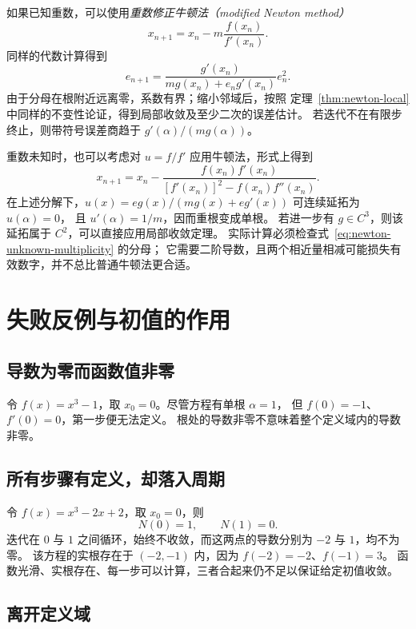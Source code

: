 \documentclass[UTF8,12pt,a4paper,fontset=fandol]{ctexart}
\begin{document}
如果已知重数，可以使用\emph{重数修正牛顿法（modified Newton method）}
\begin{equation}\label{eq:newton-modified}
  x_{n+1}=x_n-m\frac{f(x_n)}{f'(x_n)}.
\end{equation}
同样的代数计算得到
\[
  e_{n+1}=\frac{g'(x_n)}{mg(x_n)+e_ng'(x_n)}e_n^2.
\]
由于分母在根附近远离零，系数有界；缩小邻域后，按照
定理~\ref{thm:newton-local} 中同样的不变性论证，得到局部收敛及至少二次的误差估计。
若迭代不在有限步终止，则带符号误差商趋于 $g'(\alpha)/(mg(\alpha))$。

重数未知时，也可以考虑对 $u=f/f'$ 应用牛顿法，形式上得到
\begin{equation}\label{eq:newton-unknown-multiplicity}
  x_{n+1}=x_n-
  \frac{f(x_n)f'(x_n)}{[f'(x_n)]^2-f(x_n)f''(x_n)}.
\end{equation}
在上述分解下，$u(x)=eg(x)/(mg(x)+eg'(x))$ 可连续延拓为 $u(\alpha)=0$，
且 $u'(\alpha)=1/m$，因而重根变成单根。
若进一步有 $g\in C^3$，则该延拓属于 $C^2$，可以直接应用局部收敛定理。
实际计算必须检查式~\eqref{eq:newton-unknown-multiplicity} 的分母；
它需要二阶导数，且两个相近量相减可能损失有效数字，并不总比普通牛顿法更合适。

\section{失败反例与初值的作用}
\label{sec:newton-failure}

\subsection{导数为零而函数值非零}

令 $f(x)=x^3-1$，取 $x_0=0$。尽管方程有单根 $\alpha=1$，
但 $f(0)=-1$、$f'(0)=0$，第一步便无法定义。
根处的导数非零不意味着整个定义域内的导数非零。

\subsection{所有步骤有定义，却落入周期}

令 $f(x)=x^3-2x+2$，取 $x_0=0$，则
\[
  N(0)=1,\qquad N(1)=0.
\]
迭代在 $0$ 与 $1$ 之间循环，始终不收敛，而这两点的导数分别为 $-2$ 与 $1$，均不为零。
该方程的实根存在于 $(-2,-1)$ 内，因为 $f(-2)=-2$、$f(-1)=3$。
函数光滑、实根存在、每一步可以计算，三者合起来仍不足以保证给定初值收敛。

\subsection{离开定义域}
\end{document}
